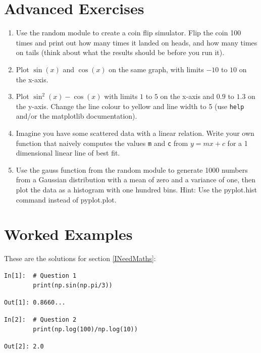 \section{Advanced Exercises}
\label{ExAdw5}

\begin{enumerate}
\item Use the random module to create a coin flip simulator. Flip the coin 100 times and print out how many times it landed on heads, and how many times on tails (think about what the results should be before you run it).
\item Plot $\sin(x)$ and $\cos(x)$ on the same graph, with limits $-10$ to $10$ on the x-axis.
\item Plot $\sin^{2}(x)-\cos(x)$ with limits $1$ to $5$ on the x-axis and $0.9$ to $1.3$ on the y-axis. Change the line colour to yellow and line width to 5 (use \texttt{help} and/or the matplotlib documentation).
\item Imagine you have some scattered data with a linear relation. Write your own function that naively computes the values \texttt{m} and \texttt{c} from $y=mx+c$ for a 1 dimensional linear line of best fit.
\item Use the gauss function from the random module to generate 1000 numbers from a Gaussian distribution with a mean of zero and a variance of one, then plot the data as a histogram with one hundred bins. Hint: Use the pyplot.hist command instead of pyplot.plot.
\end{enumerate}


\section{Worked Examples}
\label{workedanswersCh5}

\noindent These are the solutions for section \ref{INeedMaths}:
\begin{lstlisting}[style=PY]
In[1]:  # Question 1
        print(np.sin(np.pi/3))
\end{lstlisting}
\begin{lstlisting}[style=PY_out]
Out[1]: 0.8660...
\end{lstlisting}

\begin{lstlisting}[style=PY]
In[2]:  # Question 2
        print(np.log(100)/np.log(10))
\end{lstlisting}
\begin{lstlisting}[style=PY_out]
Out[2]: 2.0
\end{lstlisting}

